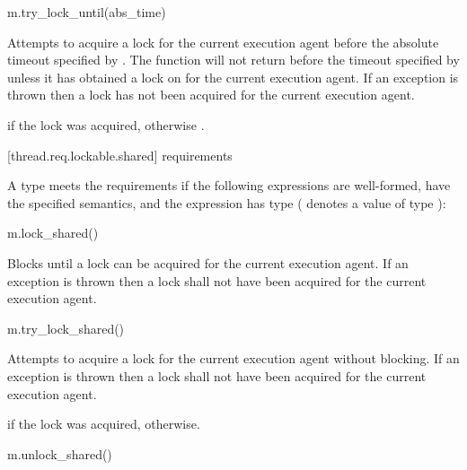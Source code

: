\begin{itemdecl}
m.try_lock_until(abs_time)
\end{itemdecl}

\begin{itemdescr}
\pnum
\effects
Attempts to acquire a lock for the current execution agent before the absolute
timeout specified by . The function will not return
before the timeout specified by  unless it has obtained a lock on  for
the current execution agent. If an exception is thrown then a lock has not been acquired
for the current execution agent.

\pnum
\result
{}

\pnum
\returns
{} if the lock was acquired, otherwise .
\end{itemdescr}

[thread.req.lockable.shared]{ requirements}

\pnum
A type  meets the  requirements if
the following expressions are well-formed, have the specified semantics, and
the expression  has type 
( denotes a value of type ):

\begin{itemdecl}
m.lock_shared()
\end{itemdecl}

\begin{itemdescr}
\pnum
\effects
Blocks until a lock can be acquired for the current execution agent.
If an exception is thrown then a lock shall not have been acquired for
the current execution agent.
\end{itemdescr}

\begin{itemdecl}
m.try_lock_shared()
\end{itemdecl}

\begin{itemdescr}
\pnum
\effects
Attempts to acquire a lock for the current execution agent without blocking.
If an exception is thrown then a lock shall not have been acquired for
the current execution agent.

\pnum
\returns
{} if the lock was acquired,  otherwise.
\end{itemdescr}

\begin{itemdecl}
m.unlock_shared()
\end{itemdecl}

